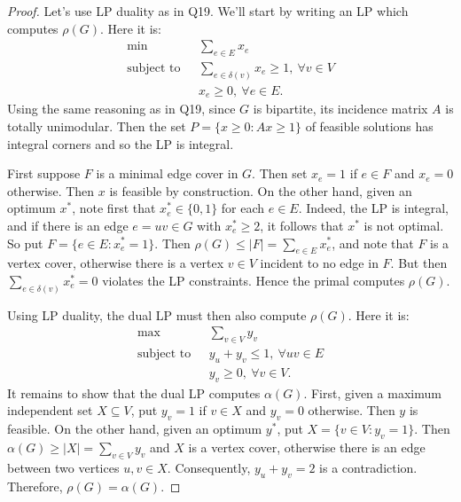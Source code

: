 \begin{proof}
Let's use LP duality as in Q19. We'll start by writing an LP which computes \( \rho (G) \). Here it is:
\begin{align*}
    \text{min} \ \ \ & \sum_{e \in E}^{} x_{e}  \\
    \text{subject to} \ \ \ & \sum_{e \in \delta (v) }^{} x_{e} \geq 1, \ \forall v \in V \\
			    & x_{e} \geq 0, \ \forall e \in E.
\end{align*}
Using the same reasoning as in Q19, since \( G \) is bipartite, its incidence matrix \( A \) is totally unimodular. Then the set \( P = \{ x \geq 0 : Ax \geq 1 \}  \) of feasible solutions has integral corners and so the LP is integral.

First suppose \( F \) is a minimal edge cover in \( G \). Then set \( x_{e} = 1 \) if \( e \in F \) and \( x_{e} = 0 \) otherwise. Then \( x \) is feasible by construction. On the other hand, given an optimum \( x^{\ast}  \), note first that \( x^{\ast}_{e} \in \{ 0,1 \}  \) for each \( e \in E \). Indeed, the LP is integral, and if there is an edge \( e = uv \in G \) with \( x_{e}^{\ast} \geq 2  \), it follows that \( x^{\ast}  \) is not optimal. So put \( F = \{ e \in E : x^{\ast} _{e} = 1 \}  \). Then \( \rho (G) \leq |F| = \sum_{e \in E}^{} x_{e}^{\ast}   \), and note that \( F \) is a vertex cover, otherwise there is a vertex \( v \in V \) incident to no edge in \( F \). But then \( \sum_{e \in \delta (v)}^{} x^{\ast}_{e} = 0  \) violates the LP constraints. Hence the primal computes \( \rho (G) \).

Using LP duality, the dual LP must then also compute \( \rho (G) \). Here it is:
\begin{align*}
    \text{max} \ \ \ & \sum_{v \in V}^{} y_{v}   \\
    \text{subject to} \ \ \ & y_{u} + y_{v} \leq 1, \ \forall uv \in E \\
			    & y_{v} \geq 0, \ \forall v \in V.
\end{align*}
It remains to show that the dual LP computes \( \alpha(G) \). First, given a maximum independent set \( X \subseteq V \), put \( y_{v} = 1 \) if \( v \in X \) and \( y_{v} = 0 \) otherwise. Then \( y \) is feasible. On the other hand, given an optimum \( y^{\ast}  \), put \( X = \{ v \in V : y_{v} = 1 \}  \). Then \( \alpha (G) \geq |X| = \sum_{v \in V}^{} y_{v}  \) and \( X \) is a vertex cover, otherwise there is an edge between two vertices \( u, v \in X \). Consequently, \( y_{u} + y_{v} = 2 \) is a contradiction. Therefore, \( \rho (G) = \alpha (G) \).
\end{proof}
